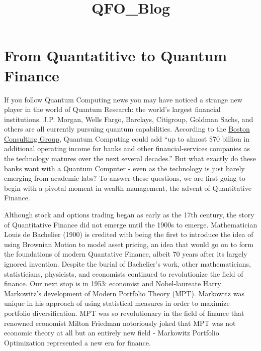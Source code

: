 \documentclass[11pt]{article}
\title{QFO\_Blog}
\begin{document}
    
    \maketitle
    
    

    
    \hypertarget{from-quantatitive-to-quantum-finance}{%
\section{From Quantatitive to Quantum
Finance}\label{from-quantatitive-to-quantum-finance}}

If you follow Quantum Computing news you may have noticed a strange new
player in the world of Quantum Research: the world's largest financial
institutions. J.P. Morgan, Wells Fargo, Barclays, Citigroup, Goldman
Sachs, and others are all currently pursuing quantum capabilities.
According to the
\href{https://www.bcg.com/publications/2020/how-financial-institutions-can-utilize-quantum-computing}{Boston
Consulting Group}, Quantum Computing could add ``up to almost \$70
billion in additional operating income for banks and other
financial-services companies as the technology matures over the next
several decades.'' But what exactly do these banks want with a Quantum
Computer - even as the technology is just barely emerging from academic
labs? To answer these questions, we are first going to begin with a
pivotal moment in wealth management, the advent of Quantitative Finance.

Although stock and options trading began as early as the 17th century,
the story of Quantitative Finance did not emerge until the 1900s to
emerge. Mathematician Louis de Bachelier (1900) is credited with being
the first to introduce the idea of using Brownian Motion to model asset
pricing, an idea that would go on to form the foundations of modern
Quantative Finance, albeit 70 years after its largely ignored invention.
Despite the burial of Bachelier's work, other mathematicians,
statisticians, physicists, and economists continued to revolutionize the
field of finance. Our next stop is in 1953: economist and Nobel-laureate
Harry Markowitz's development of Modern Portfolio Theory (MPT).
Markowitz was unique in his approach of using statistical measures in
order to maximize portfolio diversification. MPT was so revolutionary in
the field of finance that renowned economist Milton Friedman notoriously
joked that MPT was not economic theory at all but an entirely new field
- Markowitz Portfolio Optimization represented a new era for finance.
\end{document}
